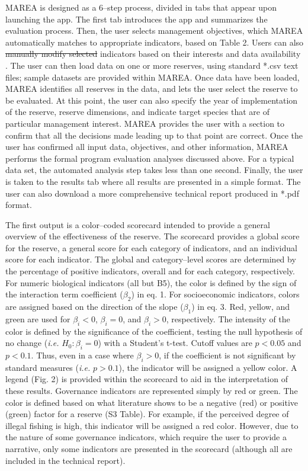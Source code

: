 \documentclass[12pt,]{article}
\providecommand{\DIFaddtex}[1]{{\protect\color{blue}\uwave{#1}}} %
\providecommand{\DIFdeltex}[1]{{\protect\color{red}\sout{#1}}}                      %
\providecommand{\DIFaddbegin}{} %
\providecommand{\DIFaddend}{} %
\providecommand{\DIFdelbegin}{} %
\providecommand{\DIFdelend}{} %
\providecommand{\DIFadd}[1]{\texorpdfstring{\DIFaddtex{#1}}{#1}} %
\providecommand{\DIFdel}[1]{\texorpdfstring{\DIFdeltex{#1}}{}} %
\newcommand{\DIFscaledelfig}{0.5}
\newlength{\DIFdelgraphicswidth} %
\newlength{\DIFdelgraphicsheight} %
\newcommand{\DIFaddincludegraphics}[2][]{{\color{blue}\fbox{\DIFOincludegraphics[#1]{#2}}}} %
\newcommand{\DIFdelincludegraphics}[2][]{%
\sbox{\DIFdelgraphicsbox}{\DIFOincludegraphics[#1]{#2}}%
\settoboxwidth{\DIFdelgraphicswidth}{\DIFdelgraphicsbox} %
\settoboxtotalheight{\DIFdelgraphicsheight}{\DIFdelgraphicsbox} %
\scalebox{\DIFscaledelfig}{%
\parbox[b]{\DIFdelgraphicswidth}{\usebox{\DIFdelgraphicsbox}\\[-\baselineskip] \rule{\DIFdelgraphicswidth}{0em}}\llap{\resizebox{\DIFdelgraphicswidth}{\DIFdelgraphicsheight}{%
\setlength{\unitlength}{\DIFdelgraphicswidth}%
\begin{picture}(1,1)%
\thicklines\linethickness{2pt} %
{\color[rgb]{1,0,0}\put(0,0){\framebox(1,1){}}}%
{\color[rgb]{1,0,0}\put(0,0){\line( 1,1){1}}}%
{\color[rgb]{1,0,0}\put(0,1){\line(1,-1){1}}}%
\end{picture}%
}\hspace*{3pt}}} %
} %
\DeclareRobustCommand{\DIFaddbegin}{\DIFOaddbegin \let\includegraphics\DIFaddincludegraphics} %
\DeclareRobustCommand{\DIFaddend}{\DIFOaddend \let\includegraphics\DIFOincludegraphics} %
\DeclareRobustCommand{\DIFdelbegin}{\DIFOdelbegin \let\includegraphics\DIFdelincludegraphics} %
\DeclareRobustCommand{\DIFdelend}{\DIFOaddend \let\includegraphics\DIFOincludegraphics} %
\begin{document}
MAREA is designed as a 6--step process, divided in tabs that appear upon
launching the app. The first tab introduces the app and summarizes the
evaluation process. Then, the user selects management objectives, which
MAREA automatically matches to appropriate indicators, based on Table 2.
Users can also \DIFdelbegin \DIFdel{manually modify selected }\DIFdelend \DIFaddbegin \DIFadd{select and un-select }\DIFaddend indicators based on their interests
and data availability \DIFaddbegin \DIFadd{by ``clicking'' on the check-boxes in MAREA}\DIFaddend . The
user can then load data on one or more reserves, using standard *.csv
text files; sample datasets are provided within MAREA. Once data have
been loaded, MAREA identifies all reserves in the data, and lets the
user select the reserve to be evaluated. At this point, the user can
also specify the year of implementation of the reserve, reserve
dimensions, and indicate target species that are of particular
management interest. MAREA provides the user with a section to confirm
that all the decisions made leading up to that point are correct. Once
the user has confirmed all input data, objectives, and other
information, MAREA performs the formal program evaluation analyses
discussed above. For a typical data set, the automated analysis step
takes less than one second. Finally, the user is taken to the results
tab where all results are presented in a simple format. The user can
also download a more comprehensive technical report produced in *.pdf
format.

The first output is a color--coded scorecard intended to provide a
general overview of the effectiveness of the reserve. The scorecard
provides a global score for the reserve, a general score for each
category of indicators, and an individual score for each indicator. The
global and category--level scores are determined by the percentage of
positive indicators, overall and for each category, respectively. For
numeric biological indicators (all but B5), the color is defined by the
sign of the interaction term coefficient (\(\beta_2\)) in eq. 1. For
socioeconomic indicators, colors are assigned based on the direction of
the slope (\(\beta_1\)) in eq. 3. Red, yellow, and green are used for
\(\beta_i<0\), \(\beta_i = 0\), and \(\beta_i>0\), respectively. The
intensity of the color is defined by the significance of the
coefficient, testing the null hypothesis of no change (\emph{i.e.}
\(H_0: \beta_i = 0\)) with a Student's t-test. Cutoff values are
\(p < 0.05\) and \(p < 0.1\). Thus, even in a case where
\(\beta_i > 0\), if the coefficient is not significant by standard
measures (\emph{i.e. } \(p>0.1\)), the indicator will be assigned a
yellow color. A legend (Fig. 2) is provided within the scorecard to aid
in the interpretation of these results. Governance indicators are
represented simply by red or green. The color is defined based on what
literature shows to be a negative (red) or positive (green) factor for a
reserve (S3 Table). For example, if the perceived degree of illegal
fishing is high, this indicator will be assigned a red color. However,
due to the nature of some governance indicators, which require the user
to provide a narrative, only some indicators are presented in the
scorecard (although all are included in the technical report).
\end{document}
